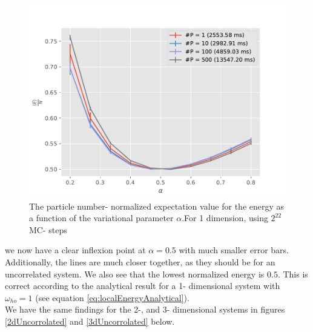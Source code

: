 \documentclass[11pt,a4paper,titlepage]{article}
\begin{document}
\begin{figure}[H]
\centering

\includegraphics[trim=0cm 0.0cm 0cm 1.0cm, clip=true,scale = 0.7]{D_1_HarmonicOscillator_SimpleGaussian_Analytical_2pow22.pdf}
\caption[No interaction (1D)]{The particle number- normalized expectation value for the energy as a function of the variational parameter $\alpha$.For 1 dimension, using $2^{22}$ MC- steps}\label{Enough}
\end{figure}

we now have a clear inflexion point at $\alpha = 0.5$ with much smaller error bars. Additionally, the lines are much closer together, as they should be for an uncorrelated system. We also see that the lowest normalized energy is $0.5$. This is correct according to the analytical result for a 1- dimensional system with $\omega_{ho} = 1$ (see equation \eqref{eq:localEnergyAnalytical}).\\We have the same findings for the 2-, and 3- dimensional systems in figures \ref{2dUncorrolated} and \ref{3dUncorrolated} below.
\end{document}
